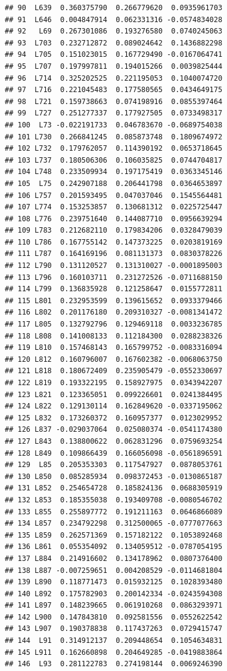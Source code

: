 \documentclass[
]{article}
\begin{document}
\begin{verbatim}
## 90  L639  0.360375790  0.266779620  0.0935961703
## 91  L646  0.004847914  0.062331316 -0.0574834028
## 92   L69  0.267301086  0.193276580  0.0740245063
## 93  L703  0.232712872  0.089024642  0.1436882298
## 94  L705  0.151023015  0.167729490 -0.0167064741
## 95  L707  0.197997811  0.194015266  0.0039825444
## 96  L714  0.325202525  0.221195053  0.1040074720
## 97  L716  0.221045483  0.177580565  0.0434649175
## 98  L721  0.159738663  0.074198916  0.0855397464
## 99  L727  0.251277337  0.177927505  0.0733498317
## 100  L73 -0.022191733  0.046783670 -0.0689754038
## 101 L730  0.266841245  0.085873748  0.1809674972
## 102 L732  0.179762057  0.114390192  0.0653718645
## 103 L737  0.180506306  0.106035825  0.0744704817
## 104 L748  0.233509934  0.197175419  0.0363345146
## 105  L75  0.242907188  0.206441798  0.0364653897
## 106 L757  0.201593495  0.047037046  0.1545564481
## 107 L774  0.153253857  0.130681312  0.0225725447
## 108 L776  0.239751640  0.144087710  0.0956639294
## 109 L783  0.212682110  0.179834206  0.0328479039
## 110 L786  0.167755142  0.147373225  0.0203819169
## 111 L787  0.164169196  0.081131373  0.0830378226
## 112 L790  0.131120527  0.131310027 -0.0001895003
## 113 L796  0.160103711  0.231272526 -0.0711688150
## 114 L799  0.136835928  0.121258647  0.0155772811
## 115 L801  0.232953599  0.139615652  0.0933379466
## 116 L802  0.201176180  0.209310327 -0.0081341472
## 117 L805  0.132792796  0.129469118  0.0033236785
## 118 L808  0.141008133  0.112184300  0.0288238326
## 119 L810  0.157468143  0.165799752 -0.0083316094
## 120 L812  0.160796007  0.167602382 -0.0068063750
## 121 L818  0.180672409  0.235905479 -0.0552330697
## 122 L819  0.193322195  0.158927975  0.0343942207
## 123 L821  0.123365051  0.099226601  0.0241384495
## 124 L822  0.129130114  0.162849620 -0.0337195062
## 125 L832  0.173260372  0.160957377  0.0123029952
## 126 L837 -0.029037064  0.025080374 -0.0541174380
## 127 L843  0.138800622  0.062831296  0.0759693254
## 128 L849  0.109866439  0.166056098 -0.0561896591
## 129  L85  0.205353303  0.117547927  0.0878053761
## 130 L850  0.085285934  0.098372453 -0.0130865187
## 131 L852  0.254654728  0.185824136  0.0688305919
## 132 L853  0.185355038  0.193409708 -0.0080546702
## 133 L855  0.255897772  0.191211163  0.0646866089
## 134 L857  0.234792298  0.312500065 -0.0777077663
## 135 L859  0.262571369  0.157182122  0.1053892468
## 136 L861  0.055354092  0.134059512 -0.0787054195
## 137 L884  0.214916602  0.134178962  0.0807376400
## 138 L887 -0.007259651  0.004208529 -0.0114681804
## 139 L890  0.118771473  0.015932125  0.1028393480
## 140 L892  0.175782903  0.200142334 -0.0243594308
## 141 L897  0.148239665  0.061910268  0.0863293971
## 142 L900  0.147843810  0.092581556  0.0552622542
## 143 L907  0.190378838  0.117437263  0.0729415747
## 144  L91  0.314912137  0.209448654  0.1054634831
## 145 L911  0.162660898  0.204649285 -0.0419883864
## 146  L93  0.281122783  0.274198144  0.0069246390
\end{verbatim}
\end{document}
